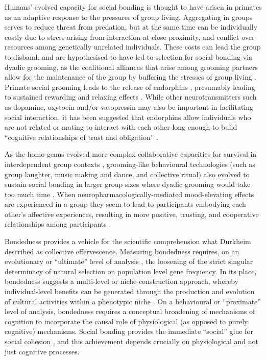 \begin{CJK}{UTF8}{gbsn}
Humans' evolved capacity for social bonding is thought to have arisen in primates as an adaptive response to the pressures of group living.  Aggregating in groups serves to reduce threat from predation, but at the same time can be individually costly due to stress arising from interaction at close proximity, and conflict over resources among genetically unrelated individuals.  These costs can lead the group to disband, and are hypothesised to have led to selection for social bonding via dyadic grooming, as the coalitional alliances that arise among grooming partners allow for the maintenance of the group by buffering the stresses of group living \citep{Dunbar2012}.  Primate social grooming leads to the release of endorphins \citep[a type of endogenous opioid, see][]{Keverne1989}, presumably leading to sustained rewarding and relaxing effects \citep{Dunbar2010}.  While other neurotransmitters such as dopamine, oxytocin and/or vasopressin may also be important in facilitating social interaction, it has been suggested that endorphins allow individuals who are not related or mating to interact with each other long enough to build ``cognitive relationships of trust and obligation'' \citep[1839]{Dunbar2012}.

As the homo genus evolved more complex collaborative capacities for survival in interdependent group contexts \citep[see][]{Dunbar1998,Tomasello2012a}, grooming-like behavioural technologies (such as group laughter, music making and dance, and collective ritual) also evolved \citep[via processes of multi-level cultural group selection, cf.][]{Wilson2008} to sustain social bonding in larger group sizes where dyadic grooming would take too much time \citep{Dunbar2012,Tarr2014,Launay2016}. When neuropharmacologically-mediated mood-elevating effects are experienced in a group they seem to lead to participants embodying each other’s affective experiences, resulting in more positive, trusting, and cooperative relationships among participants \citep{Dunbar2012}.

Bondedness provides a vehicle for the scientific comprehension what Durkheim described as collective effervescence.  Measuring bondedness requires, on an evolutionary or ``ultimate'' level of analysis \citep[for the theoretical distinction between proximate and ultimate levels of analysis of biological phenomena, see][]{Mayr1961,Tinbergen1963}, the loosening of the strict singular determinacy of natural selection on population level gene frequency. In its place, bondedness suggests a multi-level or niche-construction approach, whereby individual-level benefits can be generated through the production and evolution of cultural activities within a phenotypic niche \citep{Dunbar2012,Laland2010,Laland2015}.  On a behavioural or ``proximate'' level of analysis, bondedness requires a conceptual broadening of mechanisms of cognition to incorporate the causal role of physiological (as opposed to purely cognitive) mechanisms.  Social bonding provides the immediate ``social'' glue for social cohesion \citep[cf.][]{Lakin2003,Bastian2014a}, and this achievement depends crucially on physiological and not just cognitive processes.


\end{CJK}
